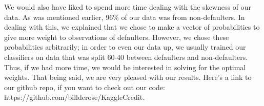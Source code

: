 \documentclass[11pt, oneside]{article}   	%
\begin{document}
	We would also have liked to spend more time dealing with the skewness of our data. As was mentioned earlier, 96\% of our data was from non-defaulters. In dealing with this, we explained that we chose to make a vector of probabilities to give more weight to observations of defaulters. However, we chose these probabilities arbitrarily; in order to even our data up, we usually trained our classifiers on data that was split 60-40 between defaulters and non-defaulters. Thus, if we had more time, we would be interested in solving for the optimal weights.
	That being said, we are very pleased with our results. Here's a link to our github repo, if you want to check out our code: https://github.com/billderose/KaggleCredit.
\end{document}
